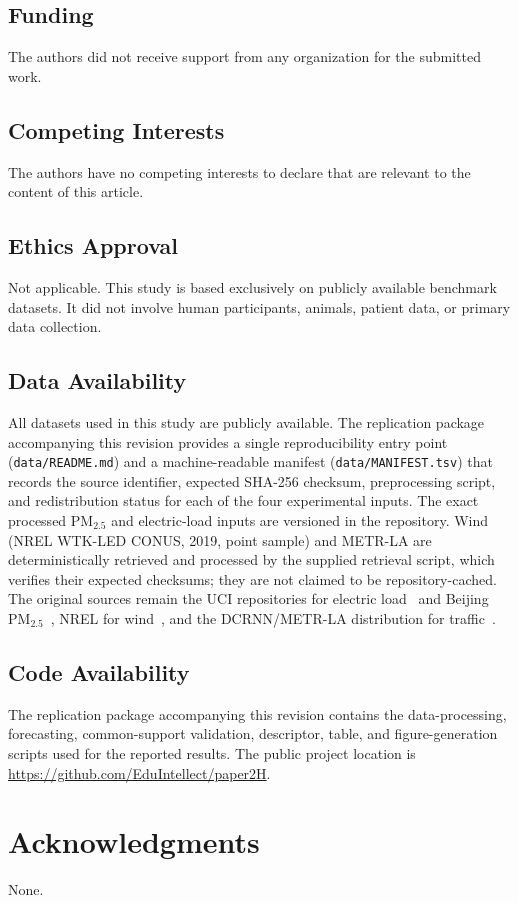\documentclass[pdflatex]{sn-jnl}
\begin{document}
\subsection*{Funding}
The authors did not receive support from any organization for the submitted work.

\subsection*{Competing Interests}
The authors have no competing interests to declare that are relevant to the content of this article.

\subsection*{Ethics Approval}
Not applicable. This study is based exclusively on publicly available benchmark datasets. It did not involve human participants, animals, patient data, or primary data collection.

\subsection*{Data Availability}
All datasets used in this study are publicly available. The replication package
accompanying this revision provides a single reproducibility entry point
(\texttt{data/README.md}) and a machine-readable manifest
(\texttt{data/MANIFEST.tsv}) that records the source identifier,
expected SHA-256 checksum, preprocessing script, and redistribution status for
each of the four experimental inputs. The exact processed PM$_{2.5}$ and
electric-load inputs are versioned in the repository. Wind (NREL WTK-LED CONUS,
2019, point sample) and METR-LA are deterministically retrieved and processed by
the supplied retrieval script, which verifies their expected checksums; they are
not claimed to be repository-cached. The original sources remain the UCI
repositories for electric load~\citep{trindade2015} and Beijing
PM$_{2.5}$~\citep{chen2015beijingpm25}, NREL for wind~\citep{draxl2015}, and
the DCRNN/METR-LA distribution for traffic~\citep{li2018dcrnn}.

\subsection*{Code Availability}
The replication package accompanying this revision contains the data-processing,
forecasting, common-support validation, descriptor, table, and figure-generation
scripts used for the reported results. The public project location is
\url{https://github.com/EduIntellect/paper2H}.

\section*{Acknowledgments}
None.




\end{document}
